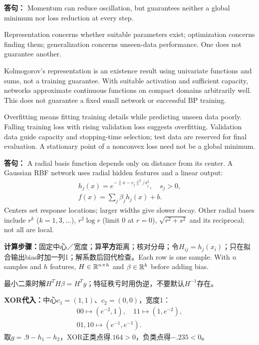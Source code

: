 \textbf{答句：} Momentum can reduce oscillation, but guarantees neither a global minimum nor loss reduction at every step.

Representation concerns whether suitable parameters exist; optimization concerns finding them; generalization concerns unseen-data performance. One does not guarantee another.

Kolmogorov's representation is an existence result using univariate functions and sums, not a training guarantee. With suitable activation and sufficient capacity, networks approximate continuous functions on compact domains arbitrarily well. This does not guarantee a fixed small network or successful BP training.

Overfitting means fitting training details while predicting unseen data poorly. Falling training loss with rising validation loss suggests overfitting. Validation data guide capacity and stopping-time selection; test data are reserved for final evaluation. A stationary point of a nonconvex loss need not be a global minimum.
\columnend\sepcol
\columnstart
{}

\textbf{答句：} A radial basis function depends only on distance from its center. A Gaussian RBF network uses radial hidden features and a linear output:
\[\begin{gathered}h_j(x)=e^{-\|x-c_j\|^2/s_j^2},\quad s_j>0,\\
f(x)=\sum_j\beta_jh_j(x)+b.\end{gathered}\]
Centers set response locations; larger widths give slower decay. Other radial bases include $r^k$ ($k=1,3,\ldots$), $r^2\log r$ (limit 0 at $r=0$), $\sqrt{r^2+s^2}$ and its reciprocal; not all are local.

\textbf{计算步骤：}固定中心／宽度；算\textbf{平方}距离；核对分母；令$H_{ij}=h_j(x_i)$；只在拟合输出bias时加一列1；解系数后回代检查。Each row is one sample. With $n$ samples and $h$ features, $H\in\mathbb{R}^{n\times h}$ and $\beta\in\mathbb{R}^h$ before adding bias.

最小二乘时解$H^TH\beta=H^Ty$；特征秩亏时用伪逆，不要默认$H^{-1}$存在。

\textbf{XOR代入：}中心$c_1=(1,1)$、$c_2=(0,0)$，宽度1：
\[\begin{gathered}00\mapsto(e^{-2},1),\quad11\mapsto(1,e^{-2}),\\
01,10\mapsto(e^{-1},e^{-1}).\end{gathered}\]
取$g=.9-h_1-h_2$，XOR正类点得$.164>0$，负类点得$-.235<0$。

